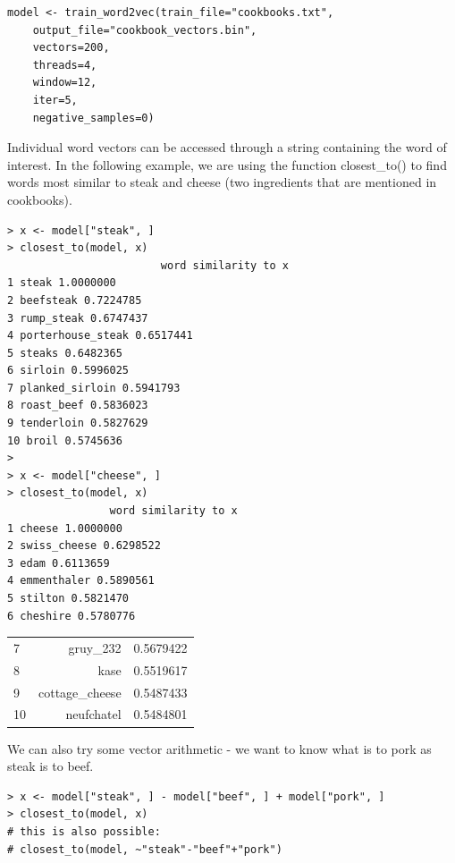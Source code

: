 \documentclass[10pt]{book}
\begin{document}
\begin{verbatim}
model <- train_word2vec(train_file="cookbooks.txt",
    output_file="cookbook_vectors.bin",
    vectors=200,
    threads=4,
    window=12,
    iter=5,
    negative_samples=0)
\end{verbatim}

Individual word vectors can be accessed through a string containing the word of interest. In the following example, we are using the function closest\_to() to find words most similar to steak and cheese (two ingredients that are mentioned in cookbooks).

\begin{verbatim}
> x <- model["steak", ]
> closest_to(model, x)
                        word similarity to x
1 steak 1.0000000
2 beefsteak 0.7224785
3 rump_steak 0.6747437
4 porterhouse_steak 0.6517441
5 steaks 0.6482365
6 sirloin 0.5996025
7 planked_sirloin 0.5941793
8 roast_beef 0.5836023
9 tenderloin 0.5827629
10 broil 0.5745636
>
> x <- model["cheese", ]
> closest_to(model, x)
                word similarity to x
1 cheese 1.0000000
2 swiss_cheese 0.6298522
3 edam 0.6113659
4 emmenthaler 0.5890561
5 stilton 0.5821470
6 cheshire 0.5780776
\end{verbatim}

\begin{center}
\begin{tabular}{lrr}
7 & gruy\_232 & 0.5679422 \\
8 & kase & 0.5519617 \\
9 & cottage\_cheese & 0.5487433 \\
10 & neufchatel & 0.5484801 \\
\end{tabular}
\end{center}

We can also try some vector arithmetic - we want to know what is to pork as steak is to beef.

\begin{verbatim}
> x <- model["steak", ] - model["beef", ] + model["pork", ]
> closest_to(model, x)
# this is also possible:
# closest_to(model, ~"steak"-"beef"+"pork")
\end{verbatim}
\end{document}
